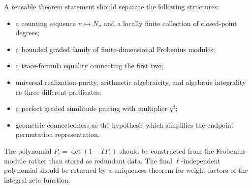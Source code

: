 \begin{formalization}
A reusable theorem statement should separate the following structures:
\begin{itemize}
\item a counting sequence \(n\mapsto N_n\) and a locally finite
      collection of closed-point degrees;
\item a bounded graded family of finite-dimensional Frobenius modules;
\item a trace-formula equality connecting the first two;
\item universal realization-purity, arithmetic algebraicity, and
      algebraic integrality as three different predicates;
\item a perfect graded similitude pairing with multiplier \(q^d\);
\item geometric connectedness as the hypothesis which simplifies the
      endpoint permutation representation.
\end{itemize}
The polynomial \(P_i=\det(1-TF_i)\) should be constructed from the
Frobenius module rather than stored as redundant data.  The final
\(\ell\)-independent polynomial should be returned by a uniqueness
theorem for weight factors of the integral zeta function.
\end{formalization}
